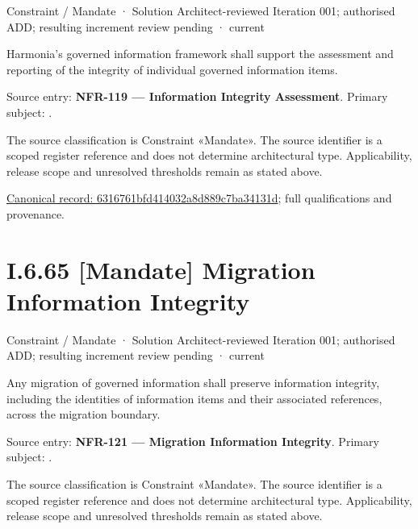 \label{element:6316761bfd414032a8d889c7ba34131d}
{\small Constraint / Mandate · Solution Architect-reviewed Iteration 001; authorised ADD; resulting increment review pending · current}\par

Harmonia's governed information framework shall support the assessment and reporting of the integrity of individual governed information items.



Source entry: \textbf{NFR-119 — Information Integrity Assessment}. Primary subject: \texttt{}.



The source classification is Constraint «Mandate». The source identifier is a scoped register reference and does not determine architectural type. Applicability, release scope and unresolved thresholds remain as stated above.


{\footnotesize \href{../../../../../../../../continuum/motivation/constraint/mandate/6316761bfd414032a8d889c7ba34131d.md}{Canonical record: 6316761bfd414032a8d889c7ba34131d}; full qualifications and provenance.}\par
\section*{I.6.65 [Mandate] Migration Information Integrity}
\label{navigation:I.6.65}

\label{element:22583ccb89dc4cf683c710760bc4b1f2}
{\small Constraint / Mandate · Solution Architect-reviewed Iteration 001; authorised ADD; resulting increment review pending · current}\par

Any migration of governed information shall preserve information integrity, including the identities of information items and their associated references, across the migration boundary.



Source entry: \textbf{NFR-121 — Migration Information Integrity}. Primary subject: \texttt{}.



The source classification is Constraint «Mandate». The source identifier is a scoped register reference and does not determine architectural type. Applicability, release scope and unresolved thresholds remain as stated above.



